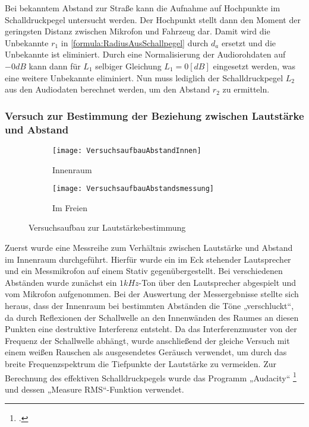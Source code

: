 Bei bekanntem Abstand zur Straße kann die Aufnahme auf Hochpunkte im Schalldruckpegel untersucht werden. Der Hochpunkt stellt dann den Moment der geringsten Distanz zwischen Mikrofon und Fahrzeug dar. Damit wird die Unbekannte \(r_{1}\) in \autoref{formula:RadiusAusSchallpegel} durch \(d_{a}\) ersetzt und die Unbekannte ist eliminiert. Durch eine Normalisierung der Audiorohdaten auf \(-0 dB\) kann dann für \(L_{1}\) selbiger Gleichung \(L_{1} = 0 [dB]\) eingesetzt werden, was eine weitere Unbekannte eliminiert. Nun muss lediglich der Schalldruckpegel \(L_{2}\) aus den Audiodaten berechnet werden, um den Abstand \(r_{2}\) zu ermitteln.


\subsubsection{Versuch zur Bestimmung der Beziehung zwischen Lautstärke und Abstand}

\begin{figure}[h]
    \begin{subfigure}{.5\textwidth}
        \centering
        \texttt{[image: VersuchsaufbauAbstandInnen]}
        \caption{Innenraum}
        \label{img:dist_room}
    \end{subfigure}
    \begin{subfigure}{.5\textwidth}
        \centering
        \texttt{[image: VersuchsaufbauAbstandsmessung]}
        \caption{Im Freien}
        \label{img:dist_free_field}
    \end{subfigure}
    \caption{Versuchsaufbau zur Lautstärkebestimmung}
    \label{img:versuche_abstand}
\end{figure}

Zuerst wurde eine Messreihe zum Verhältnis zwischen Lautstärke und Abstand im Innenraum durchgeführt. Hierfür wurde ein im Eck stehender Lautsprecher und ein Messmikrofon auf einem Stativ gegenübergestellt. Bei verschiedenen Abständen wurde zunächst ein \(1 kHz\)-Ton über den Lautsprecher abgespielt und vom Mikrofon aufgenommen. Bei der Auswertung der Messergebnisse stellte sich heraus, dass der Innenraum bei bestimmten Abständen die Töne „verschluckt“, da durch Reflexionen der Schallwelle an den Innenwänden des Raumes an diesen Punkten eine destruktive Interferenz entsteht. Da das Interferenzmuster von der Frequenz der Schallwelle abhängt, wurde anschließend der gleiche Versuch mit einem weißen Rauschen als ausgesendetes Geräusch verwendet, um durch das breite Frequenzspektrum die Tiefpunkte der Lautstärke zu vermeiden. Zur Berechnung des effektiven Schalldruckpegels wurde das Programm „Audacity“ \footcite{Audacity} und dessen „Measure RMS“-Funktion verwendet.

